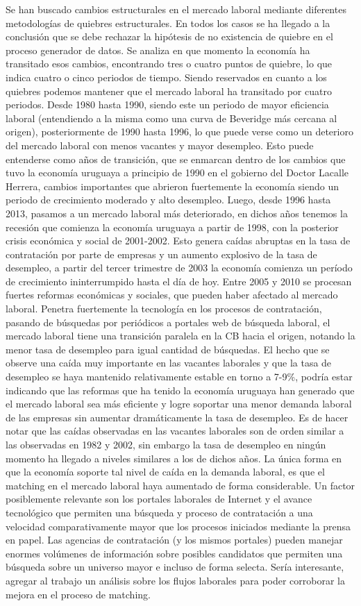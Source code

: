 \documentclass[12pt,oneside]{reedthesis}
\begin{document}
Se han buscado cambios estructurales en el mercado laboral mediante diferentes metodologías de quiebres estructurales. En todos los casos se ha llegado a la conclusión que se debe rechazar la hipótesis de no existencia de quiebre en el proceso generador de datos. Se analiza en que momento la economía ha transitado esos cambios, encontrando tres o cuatro puntos de quiebre, lo que indica cuatro o cinco periodos de tiempo. Siendo reservados en cuanto a los quiebres podemos mantener que el mercado laboral ha transitado por cuatro periodos. Desde 1980 hasta 1990, siendo este un periodo de mayor eficiencia laboral (entendiendo a la misma como una curva de Beveridge más cercana al origen), posteriormente de 1990 hasta 1996, lo que puede verse como un deterioro del mercado laboral con menos vacantes y mayor desempleo. Esto puede entenderse como años de transición, que se enmarcan dentro de los cambios que tuvo la economía uruguaya a principio de 1990 en el gobierno del Doctor Lacalle Herrera, cambios importantes que abrieron fuertemente la economía siendo un periodo de crecimiento moderado y alto desempleo. Luego, desde 1996 hasta 2013, pasamos a un mercado laboral más deteriorado, en dichos años tenemos la recesión que comienza la economía uruguaya a partir de 1998, con la posterior crisis económica y social de 2001-2002. Esto genera caídas abruptas en la tasa de contratación por parte de empresas y un aumento explosivo de la tasa de desempleo, a partir del tercer trimestre de 2003 la economía comienza un período de crecimiento ininterrumpido hasta el día de hoy. Entre 2005 y 2010 se procesan fuertes reformas económicas y sociales, que pueden haber afectado al mercado laboral. Penetra fuertemente la tecnología en los procesos de contratación, pasando de búsquedas por periódicos a portales web de búsqueda laboral, el mercado laboral tiene una transición paralela en la CB hacia el origen, notando la menor tasa de desempleo para igual cantidad de búsquedas. El hecho que se observe una caída muy importante en las vacantes laborales y que la tasa de desempleo se haya mantenido relativamente estable en torno a 7-9\%, podría estar indicando que las reformas que ha tenido la economía uruguaya han generado que el mercado laboral sea más eficiente y logre soportar una menor demanda laboral de las empresas sin aumentar dramáticamente la tasa de desempleo. Es de hacer notar que las caídas observadas en las vacantes laborales son de orden similar a las observadas en 1982 y 2002, sin embargo la tasa de desempleo en ningún momento ha llegado a niveles similares a los de dichos años. La única forma en que la economía soporte tal nivel de caída en la demanda laboral, es que el matching en el mercado laboral haya aumentado de forma considerable. Un factor posiblemente relevante son los portales laborales de Internet y el avance tecnológico que permiten una búsqueda y proceso de contratación a una velocidad comparativamente mayor que los procesos iniciados mediante la prensa en papel. Las agencias de contratación (y los mismos portales) pueden manejar enormes volúmenes de información sobre posibles candidatos que permiten una búsqueda sobre un universo mayor e incluso de forma selecta. Sería interesante, agregar al trabajo un análisis sobre los flujos laborales para poder corroborar la mejora en el proceso de matching.
\end{document}
